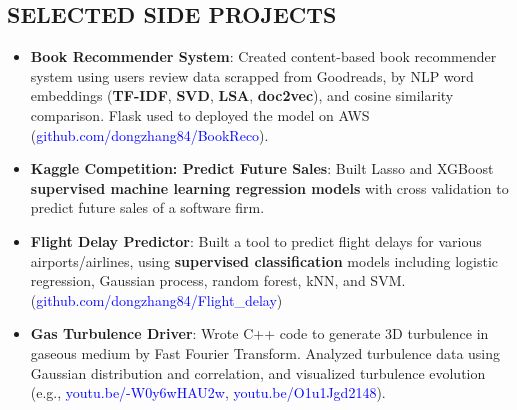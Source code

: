 \documentclass[10pt]{res}
\newcommand{\blockline}{\noindent\hspace{-0.03\textwidth}
{\rule{1.03\textwidth}{0.8pt}}}
\begin{document}
\begin{resume}
  
 

  
 
\section{\large SELECTED SIDE PROJECTS}
\vspace{-0.2cm}
\noindent{\blockline}


\begin{itemize} [leftmargin=0.0cm]
\item \textbf{Book Recommender System}: Created content-based book recommender system using users review data scrapped from Goodreads, by NLP word embeddings ({\bf TF-IDF}, {\bf SVD}, {\bf LSA}, {\bf doc2vec}), and cosine similarity comparison. Flask used to deployed the model on AWS (\textcolor{blue}{github.com/dongzhang84/BookReco}).

\vspace{0.1cm}

\item \textbf{Kaggle Competition: Predict Future Sales}: Built Lasso and XGBoost \textbf{supervised machine learning regression models} with cross validation to predict future sales of a software firm. 

\vspace{0.1cm}

\item \textbf{Flight Delay Predictor}: Built a tool to predict flight delays for various airports/airlines, using \textbf{supervised classification} models including logistic regression, Gaussian process, random forest, kNN, and SVM. \\ (\textcolor{blue}{github.com/dongzhang84/Flight\_delay})

\vspace{0.1cm}

\item \textbf{Gas Turbulence Driver}: Wrote C++ code to generate 3D turbulence in gaseous medium by Fast Fourier Transform. Analyzed turbulence data using Gaussian distribution and correlation, and visualized turbulence evolution (e.g., \textcolor{blue}{youtu.be/-W0y6wHAU2w}, \textcolor{blue}{youtu.be/O1u1Jgd2148}).

\end{itemize}

 \vspace{-0.2cm}
  

\end{resume}
\end{document}
